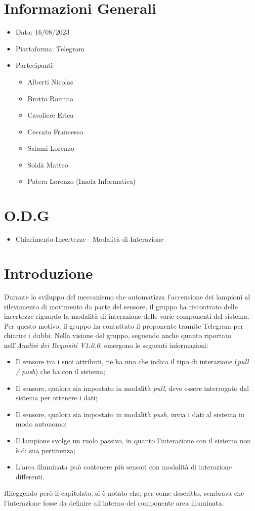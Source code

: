 \documentclass[a4paper, 12pt]{article}
\begin{document}
\makefrontpage
\section*{Informazioni Generali}
\begin{itemize}
    \item Data: 16/08/2023
    \item Piattaforma: Telegram
    \item Partecipanti
    \begin{itemize}
        \item Alberti Nicolas
        \item Brotto Romina
        \item Cavaliere Erica
        \item Ceccato Francesco
        \item Salami Lorenzo
        \item Soldà Matteo
        \item Patera Lorenzo (Imola Informatica)
    \end{itemize}
\end{itemize}
\section*{O.D.G}
\begin{itemize}
    \item Chiarimento Incertezze - Modalità di Interazione
\end{itemize}

\section*{Introduzione}
Durante lo sviluppo del meccanismo che automatizza l'accensione dei lampioni al rilevamento di movimento da parte del sensore, il gruppo ha riscontrato delle incertezze riguardo la modalità di interazione delle varie componenti del sistema. Per questo motivo, il gruppo ha contattato il proponente tramite Telegram per chiarire i dubbi.
Nella visione del gruppo, seguendo anche quanto riportato nell'\textit{Analisi dei Requisiti V1.0.0}, emergono le seguenti informazioni:
\begin{itemize}
    \item Il sensore tra i suoi attributi, ne ha uno che indica il tipo di interazione (\textit{pull / push}) che ha con il sistema;
    \item Il sensore, qualora sia impostato in modalità \textit{pull}, deve essere interrogato dal sistema per ottenere i dati;
    \item Il sensore, qualora sia impostato in modalità \textit{push}, invia i dati al sistema in modo autonomo;
    \item Il lampione svolge un ruolo passivo, in quanto l'interazione con il sistema non è di sua pertinenza;
    \item L'area illuminata può contenere più sensori con modalità di interazione differenti.
\end{itemize}
Rileggendo però il capitolato, si è notato che, per come descritto, sembrava che l'interazione fosse da definire all'interno del componente area illuminata.
\end{document}
